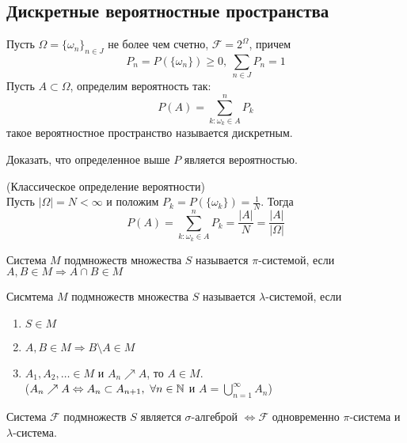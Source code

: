 \documentclass[a4paper, 12pt]{article}
\begin{document}
\subsection{Дискретные вероятностные пространства}
\begin{definition}
    Пусть $\Omega=\{\omega_n\}_{n\in J}$ не более чем счетно, $\mathcal{F}=2^{\Omega}$, причем
    \[P_n=P(\{\omega_n\})\geq 0,\ \sum_{n\in J} P_n =1\]
    Пусть $A\subset \Omega$, определим вероятность так:
    \[P(A)=\sum\limits_{k: \omega_k\in A}^{n}P_k\]
    такое вероятностное пространство называется дискретным.
\end{definition}
\begin{exercise}
    Доказать, что определенное выше $P$ является вероятностью.
\end{exercise}
\begin{definition} (Классическое определение вероятности)\\
    Пусть $|\Omega|=N<\infty$ и положим $P_k=P(\{\omega_k\})=\frac{1}{N}$. Тогда
    \[P(A)=\sum\limits_{k: \omega_k\in A}^{n}P_k=\frac{|A|}{N}=\frac{|A|}{|\Omega|}\]
\end{definition}
\begin{definition}
    Система $M$ подмножеств множества $S$ называется $\pi$-системой, если $A,B\in M \Rightarrow A\cap B\in M$
\end{definition}
\begin{definition}
    Сисмтема $M$ подмножеств множества $S$ называется $\lambda$-системой, если
    \begin{enumerate}
        \item $S\in M$
        \item $A,B\in M \Rightarrow B\setminus A\in M$
        \item $A_1, A_2, \dots \in M$ и $A_n \nearrow A$, то $A\in M$.\\
        ($A_n \nearrow A \Leftrightarrow A_n\subset A_{n+1},\ \forall n\in \mathbb{N}$ и $A=\bigcup\limits_{n=1}^{\infty}A_n$)
    \end{enumerate}
\end{definition}
\begin{theorem}
    Система $\mathcal{F}$ подмножеств $S$ является $\sigma$-алгеброй $\Leftrightarrow \mathcal{F}$ одновременно $\pi$-система и $\lambda$-система.
\end{theorem}
\end{document}
